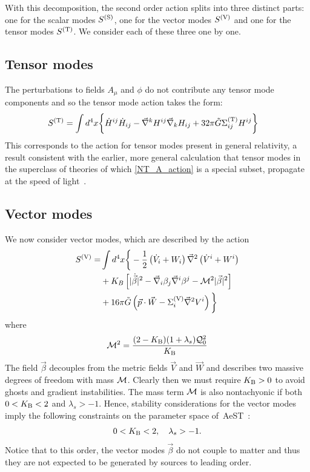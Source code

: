 \documentclass[twocolumn,prd,preprintnumbers,amsmath,amssymb,nofootinbib,superscriptaddress]{revtex4-1}
\newcommand{\scal}{\ensuremath{{\rm S}}}
\newcommand{\vect}{\ensuremath{{\rm V}}}
\newcommand{\tens}{\ensuremath{{\rm T}}}
\newcommand{\grad}{\ensuremath{\vec{\nabla}}}
\newcommand{\AeST}{AeST~}
\newcommand{\lambdas}{\lambda_s}
\newcommand{\Mcal}{{\cal M}}
\newcommand{\Qcal}{{\cal Q}}
\newcommand{\Gt}{\ensuremath{\tilde{G}}}
\newcommand{\KB}{\ensuremath{K_{{\rm B}}}}
\begin{document}
With this decomposition, the second order action splits into three distinct parts: one for the scalar modes $S^{(\scal)}$, one for the vector modes $S^{(\vect)}$ and one for the tensor modes $S^{(\tens)}$. 
We consider each of these three one by one.


\subsection{Tensor modes}

The perturbations to fields $A_\mu$ and $\phi$ do not contribute any tensor mode components and so  the tensor mode action takes the form:
\begin{align}
S^{(\tens)} &=  \int d^{4}x  \bigg\{\dot{H}^{ij}\dot{H}_{ij}- \grad^{k}H^{ij}\grad_{k}H_{ij}
 + 32 \pi \Gt  \Sigma^{(\tens)}_{ij} H^{ij} \bigg\}
\end{align}
This corresponds to the action for tensor modes present in general relativity, a result consistent with the earlier, 
more general calculation that tensor modes in the superclass of theories of which \eqref{NT_A_action} is a special subset, propagate at the speed of light~\cite{SkordisZlosnik2019}.
 
\subsection{Vector modes}

We now consider vector modes, which are described  by the action
\begin{align}
S^{(\vect)} =&  \int d^4x  \bigg\{
-  \frac{1}{2} \left(\dot{V}_{i} + W_i\right)\grad^2\left(\dot{V}^{i}  + W^i\right)
 \nonumber 
\\
& +  K_{B}\left[ |\dot{\vec{\beta}}|^2 - \grad_i \beta_j \grad^i \beta^j -  \Mcal^2  |\vec{\beta}|^2 \right]
 \nonumber 
\\
&
+ 16\pi \Gt  \left(    \vec{p} \cdot \vec{W} - \Sigma^{(\vect)}_i \grad^2 V^i 
\right)
 \bigg\} 
\end{align}
where
\begin{equation}
 \Mcal^2 = \frac{(2-\KB)(1 + \lambdas )  \Qcal_0^2}{\KB}
\label{Mass_of_modes}
\end{equation}
The field $\vec{\beta}$  decouples from the metric fields $\vec{V}$ and $\vec{W}$ and describes two massive degrees of freedom with mass $\Mcal$. 
Clearly then we must require $\KB>0$ to avoid ghosts and gradient instabilities. The mass term $\Mcal$
 is also nontachyonic if both $0<\KB<2$ and $\lambdas>-1$. 
Hence,  stability considerations for the vector modes imply the following constraints on the parameter space of~\AeST:
\begin{align}
 0<\KB<2, \quad \lambdas > -1.
  \label{vector_constraints}
\end{align}
Notice that to this order, the vector modes $\vec{\beta}$ do not couple to matter and thus they are not expected to be generated by sources to leading order.
\end{document}

